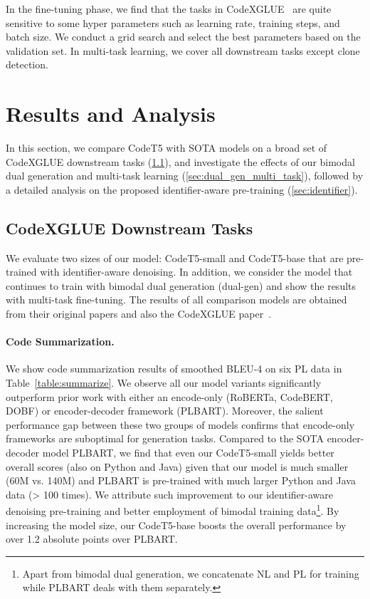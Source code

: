 \documentclass[11pt]{article}
\begin{document}
In the fine-tuning phase, we find that the tasks in  CodeXGLUE~\cite{DBLP:journals/corr/abs-2102-04664}  are quite sensitive to  some hyper parameters such as learning rate, training steps, and batch size. We conduct a grid search  and select the best parameters based on the validation set.
In  multi-task learning, we cover all downstream tasks except  clone detection. 
 \section{Results and Analysis}
In this section, we compare CodeT5 with SOTA models on a broad set of CodeXGLUE downstream tasks (\cref{sec:downstream}), and  investigate the effects of our  bimodal dual generation and multi-task learning (\cref{sec:dual_gen_multi_task}), followed by a detailed analysis on the proposed identifier-aware  pre-training (\cref{sec:identifier}).
\subsection{CodeXGLUE Downstream Tasks}\label{sec:downstream}
We evaluate two sizes of our model: CodeT5-small and CodeT5-base that are pre-trained with  identifier-aware denoising. In addition, we consider the model that continues to train with bimodal dual generation (dual-gen) and show the results with   multi-task fine-tuning. The results of all comparison models are obtained from their original papers and also the CodeXGLUE paper~\cite{DBLP:journals/corr/abs-2102-04664}.

\vspace{-0.5em}
\paragraph{Code Summarization.}
We show code summarization results of smoothed BLEU-4 on six PL data in Table~\ref{table:summarize}. We observe all our model variants significantly  outperform prior work with either an encode-only (RoBERTa, CodeBERT, DOBF) or encoder-decoder framework (PLBART). 
Moreover, the salient performance gap between these two groups of models confirms that encode-only frameworks are suboptimal for generation tasks.
Compared to the SOTA encoder-decoder model PLBART, we  find that even our CodeT5-small yields better overall scores (also on Python and Java) given that our model is much smaller (60M vs. 140M) and  PLBART  is pre-trained with  much larger Python and Java data (> 100 times).
We attribute such improvement to our identifier-aware denoising pre-training and better employment of bimodal training data\footnote{Apart from bimodal dual generation, we concatenate NL and PL for training while PLBART deals with them separately.}.
By increasing the model size, our CodeT5-base boosts the overall performance by over 1.2 absolute points over PLBART.
\end{document}
